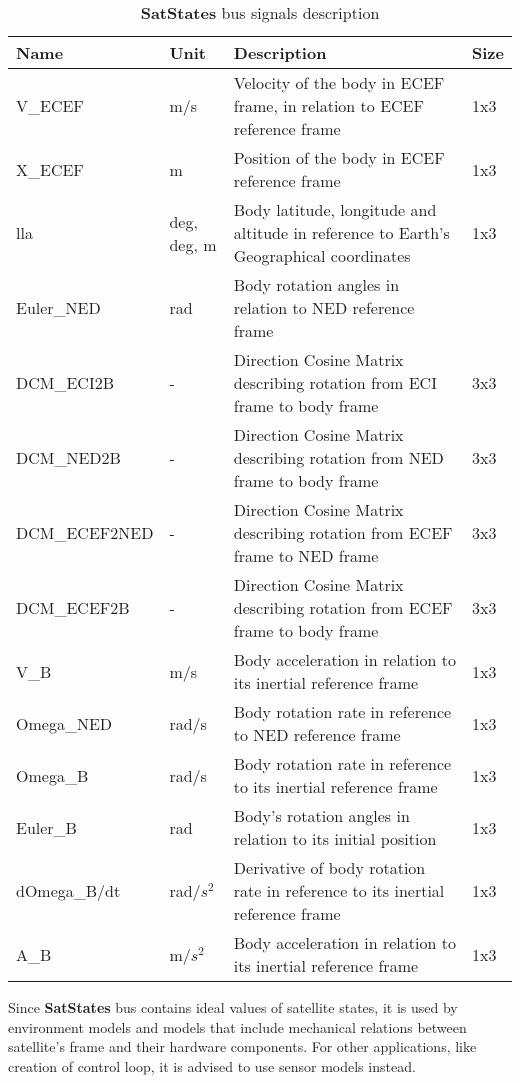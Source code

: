         \begin{table}[H]
            \begin{tabularx}{\textwidth}{llXl}
            \textbf{Name} & \textbf{Unit} & \textbf{Description} & \textbf{Size} \\[0.1cm]\hline
            \rule{0pt}{1.2\normalbaselineskip}V\_ECEF & m/s & Velocity of the body in ECEF frame, in relation to ECEF reference frame & 1x3 \\
            X\_ECEF & m & Position of the body in ECEF reference frame & 1x3 \\
            lla & deg, deg, m & Body latitude, longitude and altitude in reference to Earth's Geographical coordinates & 1x3 \\
            Euler\_NED & rad & Body rotation angles in relation to NED reference frame &  \\
            DCM\_ECI2B & - & Direction Cosine Matrix describing rotation from ECI frame to body frame & 3x3 \\
            DCM\_NED2B & - &  Direction Cosine Matrix describing rotation from NED frame to body frame & 3x3  \\
            DCM\_ECEF2NED & - & Direction Cosine Matrix describing rotation from ECEF frame to NED frame & 3x3  \\
            DCM\_ECEF2B & - &  Direction Cosine Matrix describing rotation from ECEF frame to body frame & 3x3  \\
            V\_B & m/s & Body acceleration in relation to its inertial reference frame &  1x3 \\
            Omega\_NED & rad/s & Body rotation rate in reference to NED reference frame & 1x3  \\
            Omega\_B & rad/s & Body rotation rate in reference to its inertial reference frame  & 1x3 \\
            Euler\_B & rad & Body's rotation angles in relation to its initial position  & 1x3 \\
            dOmega\_B/dt & rad/$s^2$ & Derivative of body rotation rate in reference to its inertial reference frame & 1x3 \\
            A\_B & m/$s^2$ & Body acceleration in relation to its inertial reference frame & 1x3
            \end{tabularx}
            \caption{\textbf{SatStates} bus signals description}
        \end{table}

        Since \textbf{SatStates} bus contains ideal values of satellite states, it is used by environment models and models that include mechanical relations between satellite's frame and their hardware components. For other applications, like creation of control loop, it is advised to use sensor models instead.

